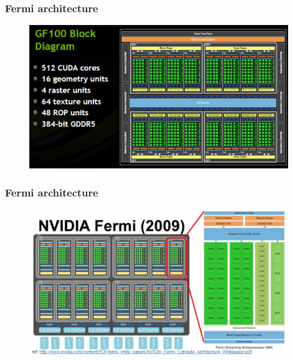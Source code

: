 \documentclass{beamer}
\begin{document}
\begin{frame}
\frametitle{Fermi architecture}
\begin{figure}
	\centering
	\includegraphics[scale=0.6]{fermi2}
\end{figure}

\end{frame}

\begin{frame}
\frametitle{Fermi architecture}
\begin{figure}
	\centering
	\includegraphics[scale=0.45]{fermi3}
\end{figure}

\end{frame}
\end{document}
